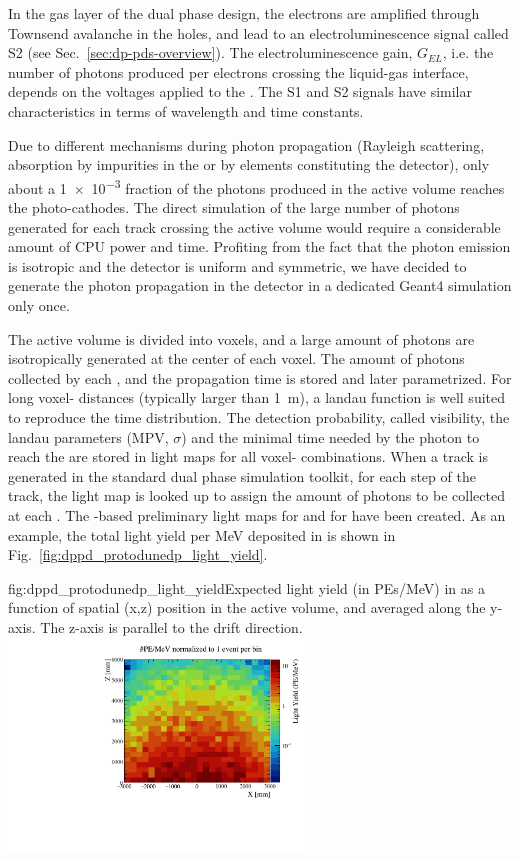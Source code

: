 In the gas layer of the dual phase design, the electrons are amplified through Townsend avalanche in the  holes, and lead to an electroluminescence signal called S2 (see Sec.~\ref{sec:dp-pds-overview}). The electroluminescence gain, $G_{EL}$, i.e. the number of photons produced per electrons crossing the liquid-gas interface, depends on the voltages applied to the . The S1 and S2 signals have similar characteristics in terms of wavelength and time constants. 

Due to different mechanisms during photon propagation (Rayleigh scattering, absorption by impurities in the \lar or by elements constituting the detector), only about a \num{1e-3} fraction of the photons produced in the \lar active volume reaches the  photo-cathodes. The direct simulation of the large number of photons generated for each track crossing the active volume would require a considerable amount of CPU power and time. Profiting from the fact that the photon emission is isotropic and the detector is uniform and symmetric, we have decided to generate the photon propagation in the detector in a dedicated Geant4 simulation only once.

The active volume is divided into voxels, and a large amount of photons are isotropically generated at the center of each voxel. 
The amount of photons collected by each , and the propagation time is stored and later parametrized. For long voxel- distances (typically larger than \SI{1}{\m}), a landau function is well suited to reproduce the time distribution.
The detection probability, called visibility, the landau parameters (MPV, $\sigma$) and the minimal time needed by the photon to reach the  are stored in light maps for all voxel- combinations. When a track is generated in the standard dual phase  simulation toolkit, for each step of the track, the light map is looked up to assign the amount of photons to be collected at each . The -based preliminary light maps for  and for   have been created. As an example, the total light yield per MeV deposited in  is shown in Fig.~\ref{fig:dppd_protodunedp_light_yield}.

\begin{dunefigure}{fig:dppd_protodunedp_light_yield}{Expected light yield (in PEs/MeV) in  as a function of spatial (x,z) position in the  active volume, and averaged along the y-axis. The z-axis is parallel to the drift direction.}
\includegraphics[width=0.6\textwidth]{graphics/dppd_protodunedp_light_yield.pdf}
\end{dunefigure}

